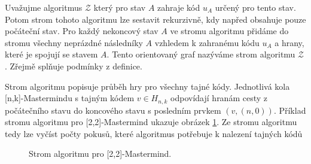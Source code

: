 \begin{pozn}
    Uvažujme algoritmus $\mathcal{Z}$ který pro stav $A$ zahraje kód $u_A$ určený pro tento stav. Potom strom tohoto algoritmu lze sestavit rekurzivně, kdy napřed obsahuje pouze počáteční stav. Pro každý nekoncový stav $A$ ve stromu algoritmu přidáme do stromu všechny neprázdné následníky $A$ vzhledem k zahranému kódu $u_A$ a hrany, které je spojují se stavem $A$. Tento orientovaný graf nazýváme strom algoritmu $\mathcal{Z}$. Zřejmě splňuje podmínky z definice. 
\end{pozn}
 Strom algoritmu popisuje průběh hry pro všechny tajné kódy. Jednotlivá kola [n,k]-Mastermindu s tajným kódem $v\in H_{n,k}$ odpovídají hranám cesty z počátečního stavu do koncového stavu s posledním prvkem $(v,(n,0))$. Příklad stromu algoritmu pro [2,2]-Mastermind ukazuje obrázek \ref{figprikladstromualgoritmu}. Ze stromu algoritmu tedy lze vyčíst počty pokusů, které algoritmus potřebuje k nalezení tajných kódů




\begin{figure}[h!]
    \centering
    \caption{Strom algoritmu pro [2,2]-Mastermind.}
\label{figprikladstromualgoritmu}
\end{figure}


